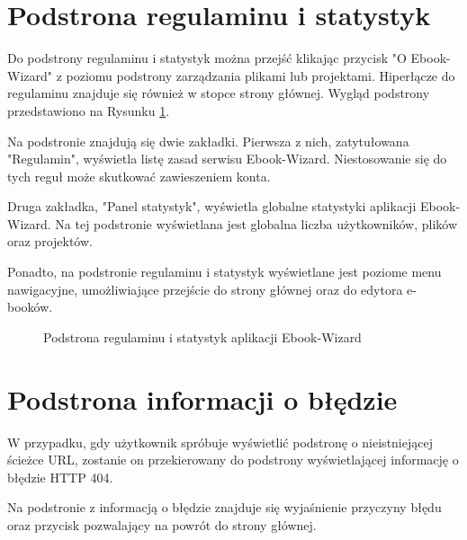 \section{Podstrona regulaminu i statystyk}

Do podstrony regulaminu i statystyk można przejść klikając przycisk "O Ebook-Wizard" z poziomu podstrony zarządzania plikami lub projektami. Hiperłącze do regulaminu znajduje się również w stopce strony głównej. Wygląd podstrony przedstawiono na Rysunku \ref{fig:page_stats}.

Na podstronie znajdują się dwie zakładki. Pierwsza z nich, zatytułowana "Regulamin", wyświetla listę zasad serwisu Ebook-Wizard. Niestosowanie się do tych reguł może skutkować zawieszeniem konta. 

Druga zakładka, "Panel statystyk", wyświetla globalne statystyki aplikacji Ebook-Wizard. Na tej podstronie wyświetlana jest globalna liczba użytkowników, plików oraz projektów.

Ponadto, na podstronie regulaminu i statystyk wyświetlane jest poziome menu nawigacyjne, umożliwiające przejście do strony głównej oraz do edytora e-booków.

\begin{figure}[h]
    \centering
    \setlength{\fboxsep}{0pt}
    \setlength{\fboxrule}{0.4pt}
    \caption{Podstrona regulaminu i statystyk aplikacji Ebook-Wizard}
    \label{fig:page_stats}
\end{figure}

\section{Podstrona informacji o błędzie}

W przypadku, gdy użytkownik spróbuje wyświetlić podstronę o nieistniejącej ścieżce URL, zostanie on przekierowany do podstrony wyświetlającej informację o błędzie HTTP 404.

Na podstronie z informacją o błędzie znajduje się wyjaśnienie przyczyny błędu oraz przycisk pozwalający na powrót do strony głównej.

